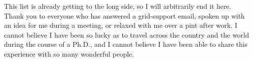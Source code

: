 This list is already getting to the long side, so I will arbitrarily end it here. Thank you to everyone who has answered a grid-support email, spoken up with an idea for me during a meeting, or relaxed with me over a pint after work. I cannot believe I have been so lucky as to travel across the country and the world during the course of a Ph.D., and I cannot believe I have been able to share this experience with so many wonderful people.


